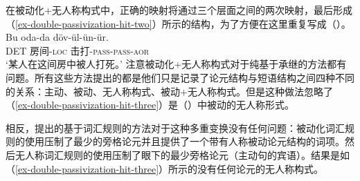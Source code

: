 \begin{exe}
\begin{xlist}[iv.]
\begin{exe}
\begin{xlist}[iv.]
\noindent
在被动化+无人称构式中，正确的映射将通过三个层面之间的两次映射，最后形成（\ref{ex-double-passivization-hit-two}）所示的结构，为了方便在这里重复写成（）。 
\ea
\label{ex-double-passivization-hit-three}
\gll Bu oda-da döv-ül-ün-ür.\\
     DET 房间-\textsc{loc} 击打-\textsc{pass}-\textsc{pass}-\textsc{aor}\\
\glt `某人在这间房中被人打死。'
\z
注意被动化+无人称构式对于纯基于承继的方法都有问题。所有这些方法提出的都是他们只是记录了论元结构与短语结构之间四种不同的关系：主动、被动、无人称构式、被动+无人称构式。但是这种做法忽略了（\ref{ex-double-passivization-hit-three}）是（）中被动的无人称形式。

相反，\citet{Mueller2003e}提出的基于词汇规则的方法对于这种多重变换没有任何问题：被动化词汇规则的使用压制了最少的旁格论元并且提供了一个带有人称被动论元结构的词项。然后无人称词汇规则的使用压制了眼下的最少旁格论元（主动句的宾语）。结果是如（\ref{ex-double-passivization-hit-three}）所示的没有任何论元的无人称构式。


\end{xlist}
\end{exe}
\end{xlist}
\end{exe}
